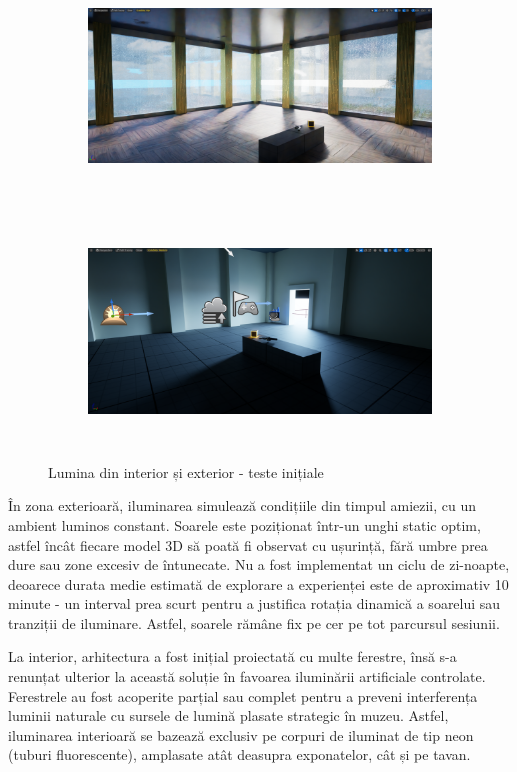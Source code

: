 \begin{figure}[h!]
    \centering
    \begin{subfigure}{0.49\textwidth}
        \includegraphics[width=\linewidth, height=6cm]{continut/capitol3/figuri/ray2.png}
        \label{fig:Ray Tracing}
    \end{subfigure}
    \hfill
    \begin{subfigure}{0.49\textwidth}
        \includegraphics[width=\linewidth, height=6cm]{continut/capitol3/figuri/ray_traced.png}
        \label{fig:Ray Tracing}
    \end{subfigure}
    \caption{Lumina din interior și exterior - teste inițiale}
\end{figure}

În zona exterioară, iluminarea simulează condițiile din timpul amiezii, cu un ambient luminos constant. Soarele este poziționat într-un unghi static optim, astfel încât fiecare model 3D să poată fi observat cu ușurință, fără umbre prea dure sau zone excesiv de întunecate. Nu a fost implementat un ciclu de zi-noapte, deoarece durata medie estimată de explorare a experienței este de aproximativ 10 minute - un interval prea scurt pentru a justifica rotația dinamică a soarelui sau tranziții de iluminare. Astfel, soarele rămâne fix pe cer pe tot parcursul sesiunii.

La interior, arhitectura a fost inițial proiectată cu multe ferestre, însă s-a renunțat ulterior la această soluție în favoarea iluminării artificiale controlate. Ferestrele au fost acoperite parțial sau complet pentru a preveni interferența luminii naturale cu sursele de lumină plasate strategic în muzeu. Astfel, iluminarea interioară se bazează exclusiv pe corpuri de iluminat de tip neon (tuburi fluorescente), amplasate atât deasupra exponatelor, cât și pe tavan.

